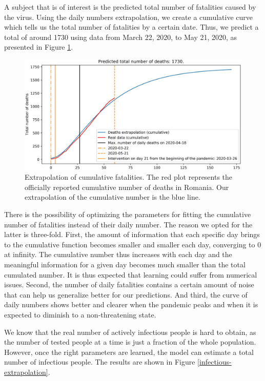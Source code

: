 \documentclass[11pt]{article}
\begin{document}
A subject that is of interest is the predicted total number of fatalities caused by the virus. Using the daily numbers extrapolation, we create a cumulative curve which tells us the total number of fatalities by a certain date. Thus, we predict a total of around 1730 using data from March 22, 2020, to May 21, 2020, as presented in Figure \ref{cum-deaths-extrapolation}.

\begin{figure}[H]
  \centering
  \includegraphics[width=0.8\linewidth]{figs/best_fit/2020-5-21_4_primary_wave-cumulative_deaths_extrapolation.pdf}
  \caption{Extrapolation of cumulative fatalities. The red plot represents the officially reported cumulative number of deaths in Romania. Our extrapolation of the cumulative number is the blue line.}
  \label{cum-deaths-extrapolation}
\end{figure}

There is the possibility of optimizing the parameters for fitting the cumulative number of fatalities instead of their daily number. The reason we opted for the latter is three-fold. First, the amount of information that each specific day brings to the cumulative function becomes smaller and smaller each day, converging to 0 at infinity. The cumulative number thus increases with each day and the meaningful information for a given day becomes much smaller than the total cumulated number. It is thus expected that learning could suffer from numerical issues. Second, the number of daily fatalities contains a certain amount of noise that can help us generalize better for our predictions. And third, the curve of daily numbers shows better and clearer when the pandemic peaks and when it is expected to diminish to a non-threatening state.

We know that the real number of actively infectious people is hard to obtain, as the number of tested people at a time is just a fraction of the whole population. However, once the right parameters are learned, the model can estimate a total number of infectious people. The results are shown in Figure \ref{infectious-extrapolation}.
\end{document}
